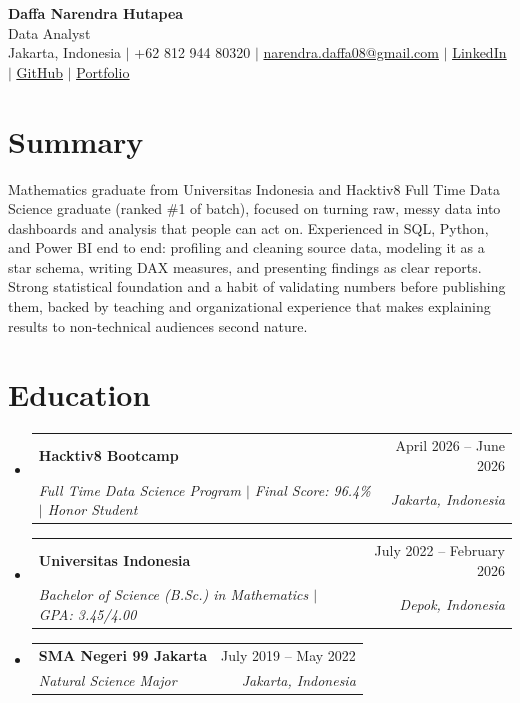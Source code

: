 \documentclass[letterpaper,10pt]{article}
\makeatletter
\newcommand{\resumeSubheading}[4]{
\vspace{-1pt}\item
  \begin{tabular*}{0.97\textwidth}[t]{l@{\extracolsep{\fill}}r}
    \textbf{#1} & #2 \\
    \textit{#3} & \textit{#4} \\
  \end{tabular*}\vspace{-7pt}
}
\newcommand{\resumeSubHeadingList}{\begin{itemize}[leftmargin=0.15in, label={}]}
\newcommand{\resumeSubHeadingListEnd}{\end{itemize}}
\makeatother
\begin{document}
\begin{center}
  \textbf{\Huge Daffa Narendra Hutapea} \\ \vspace{3pt}
  {\large Data Analyst} \\ \vspace{3pt}
  \small Jakarta, Indonesia $|$ +62 812 944 80320 $|$
  \href{mailto:narendra.daffa08@gmail.com}{narendra.daffa08@gmail.com} $|$
  \href{https://linkedin.com/in/daffa-hutapea}{\underline{LinkedIn}} $|$
  \href{https://github.com/daphutapea}{\underline{GitHub}} $|$
  \href{https://daphutapea.github.io}{\underline{Portfolio}}
\end{center}

\section*{Summary}
Mathematics graduate from Universitas Indonesia and Hacktiv8 Full Time Data Science graduate (ranked \#1 of batch), focused on turning raw, messy data into dashboards and analysis that people can act on. Experienced in SQL, Python, and Power BI end to end: profiling and cleaning source data, modeling it as a star schema, writing DAX measures, and presenting findings as clear reports. Strong statistical foundation and a habit of validating numbers before publishing them, backed by teaching and organizational experience that makes explaining results to non-technical audiences second nature.

\section{Education}
\resumeSubHeadingList
  \resumeSubheading
      {Hacktiv8 Bootcamp}{April 2026 -- June 2026}
      {Full Time Data Science Program $|$ Final Score: 96.4\% $|$ Honor Student}{Jakarta, Indonesia}
  \resumeSubheading
      {Universitas Indonesia}{July 2022 -- February 2026}
      {Bachelor of Science (B.Sc.) in Mathematics $|$ GPA: 3.45/4.00}{Depok, Indonesia}
  \resumeSubheading
      {SMA Negeri 99 Jakarta}{July 2019 -- May 2022}
      {Natural Science Major}{Jakarta, Indonesia}
\resumeSubHeadingListEnd

\end{document}
